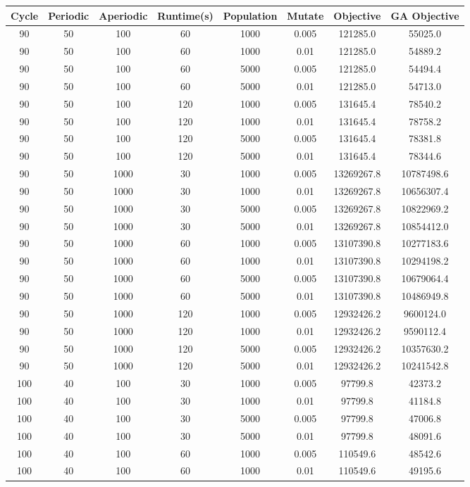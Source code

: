 \documentclass[a4paper,12pt]{article}
\begin{document}
\begin{tabular}{|c|c|c|c|c|c|c|c|}
\hline
Cycle&Periodic&Aperiodic&Runtime(s)&Population&Mutate&Objective&GA Objective\\
\hline
90&50&100&60&1000&0.005&121285.0&55025.0\\
\hline
90&50&100&60&1000&0.01&121285.0&54889.2\\
\hline
90&50&100&60&5000&0.005&121285.0&54494.4\\
\hline
90&50&100&60&5000&0.01&121285.0&54713.0\\
\hline
90&50&100&120&1000&0.005&131645.4&78540.2\\
\hline
90&50&100&120&1000&0.01&131645.4&78758.2\\
\hline
90&50&100&120&5000&0.005&131645.4&78381.8\\
\hline
90&50&100&120&5000&0.01&131645.4&78344.6\\
\hline
90&50&1000&30&1000&0.005&13269267.8&10787498.6\\
\hline
90&50&1000&30&1000&0.01&13269267.8&10656307.4\\
\hline
90&50&1000&30&5000&0.005&13269267.8&10822969.2\\
\hline
90&50&1000&30&5000&0.01&13269267.8&10854412.0\\
\hline
90&50&1000&60&1000&0.005&13107390.8&10277183.6\\
\hline
90&50&1000&60&1000&0.01&13107390.8&10294198.2\\
\hline
90&50&1000&60&5000&0.005&13107390.8&10679064.4\\
\hline
90&50&1000&60&5000&0.01&13107390.8&10486949.8\\
\hline
90&50&1000&120&1000&0.005&12932426.2&9600124.0\\
\hline
90&50&1000&120&1000&0.01&12932426.2&9590112.4\\
\hline
90&50&1000&120&5000&0.005&12932426.2&10357630.2\\
\hline
90&50&1000&120&5000&0.01&12932426.2&10241542.8\\
\hline
100&40&100&30&1000&0.005&97799.8&42373.2\\
\hline
100&40&100&30&1000&0.01&97799.8&41184.8\\
\hline
100&40&100&30&5000&0.005&97799.8&47006.8\\
\hline
100&40&100&30&5000&0.01&97799.8&48091.6\\
\hline
100&40&100&60&1000&0.005&110549.6&48542.6\\
\hline
100&40&100&60&1000&0.01&110549.6&49195.6\\

\end{tabular}
\end{document}
